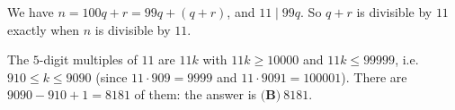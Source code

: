 We have $n=100q+r=99q+(q+r)$, and $11\mid99q$. So $q+r$ is divisible by $11$ exactly when $n$ is divisible by $11$.

The $5$-digit multiples of $11$ are $11k$ with $11k\ge10000$ and $11k\le99999$, i.e. $910\le k\le9090$ (since $11\cdot909=9999$ and $11\cdot9091=100001$). There are $9090-910+1=8181$ of them: the answer is $\boxed{\textbf{(B)}\ 8181}$.

